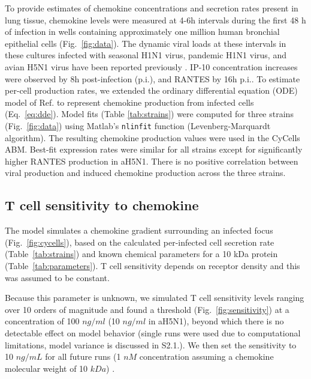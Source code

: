 \documentclass[10pt]{article}
\begin{document}
To provide estimates of chemokine concentrations and secretion rates present in lung tissue, chemokine levels were measured at 4-6h intervals during the first 48 h of infection in wells containing approximately one million human bronchial epithelial cells (Fig.~\ref{fig:data}).  The dynamic viral loads at these intervals in these cultures infected with seasonal H1N1 virus, pandemic H1N1 virus, and avian H5N1 virus have been reported previously \cite{Mitchell2011}.  IP-10 concentration increases were observed by 8h post-infection (p.i.), and RANTES by 16h p.i..  To estimate per-cell production rates, we extended the ordinary differential equation (ODE) model of Ref. \cite{Mitchell2011} to represent chemokine production from infected cells (Eq.~\ref{eq:dde}).  Model fits (Table \ref{tab:strains}) were computed for three strains (Fig.~\ref{fig:data}) using Matlab's \texttt{nlinfit} function (Levenberg-Marquardt algorithm).  The resulting chemokine production values were used in the CyCells ABM.  Best-fit expression rates were similar for all strains except for significantly higher RANTES production in aH5N1.  There is no positive correlation between viral production and induced chemokine production across the three strains.


\subsection*{T cell sensitivity to chemokine}

The model simulates a chemokine gradient surrounding an infected focus (Fig.~\ref{fig:cycells}), based on the calculated per-infected cell secretion rate (Table~\ref{tab:strains}) and known chemical parameters for a 10 kDa protein (Table~\ref{tab:parameters}).  T cell sensitivity depends on receptor density \cite{Desmetz2006} and this was assumed to be constant.

Because this parameter is unknown, we simulated T cell sensitivity levels ranging over 10 orders of magnitude and found a threshold (Fig.~\ref{fig:sensitivity}) at a concentration of 100 $ng/ml$ (10 $ng/ml$ in aH5N1), beyond which there is no detectable effect on model behavior (single runs were used due to computational limitations, model variance is discussed in S2.1.).  We then set the sensitivity to 10 $ng/mL$ for all future runs (1 $nM$ concentration assuming a chemokine molecular weight of 10 $kDa$) \cite{Gao2003}.  

\end{document}
